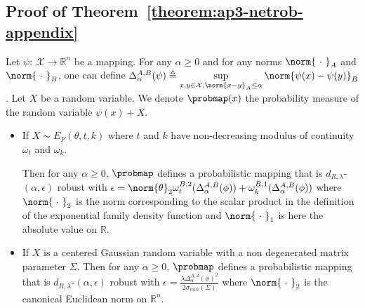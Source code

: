 \subsection{Proof of Theorem~\ref{theorem:ap3-netrob-appendix}}

\begin{lemma}
\label{theorem:ap3-exprob-appendix}

Let $\psi:\ \mathcal{X} \rightarrow \mathbb{R}^{n}$ be a mapping. For any $\alpha\geq0$ and for any norms $\norm{\ \cdot\ }_A$ and $\norm{\ \cdot\ }_B$, one can define $\Delta^{A,B}_{\alpha}(\psi) \triangleq \sup\limits_{ x,y \in \mathcal{X}, \norm{x - y}_A \leq \alpha} \norm{\psi(x) - \psi(y)}_B$. Let $X$ be a random variable. We denote $\probmap(x)$ the probability measure of the random variable $\psi(x)+X$. 
\begin{itemize}
    \item If $X\sim E_{F}(\theta,t,k)$  where $t$ and $k$ have non-decreasing modulus of continuity $\omega_t$ and $\omega_k$. 

Then for any $\alpha \geq 0$, $\probmap$ defines a probabilistic mapping that is $d_{R,\lambda}$-$(\alpha,\epsilon)$ robust
with $\epsilon = \norm{\theta}_2 \omega^{B,2}_t(\Delta^{A,B}_{\alpha}(\phi)) +\omega_k^{B,1}(\Delta^{A,B}_{\alpha}(\phi)) $ where $\norm{\ \cdot\ }_2$ is the norm corresponding to the scalar product in the definition of the exponential family density function and $\norm{\ \cdot\ }_1$ is here the absolute value on $\mathbb{R}$.
\item If $X$ is a centered Gaussian random variable with a non degenerated matrix parameter $\Sigma$. Then for any $\alpha \geq 0$, $\probmap$ defines a probabilistic mapping that is $d_{R,\lambda}$-$(\alpha,\epsilon)$ robust
with $ \epsilon = \frac{\lambda \Delta^{A,2}_{\alpha}(\phi)^2 }{2 \sigma_{min}(\Sigma) } $ where $\norm{\ \cdot\ }_2$ is the canonical Euclidean norm on $\mathbb{R}^n$.
\end{itemize}
\end{lemma}


